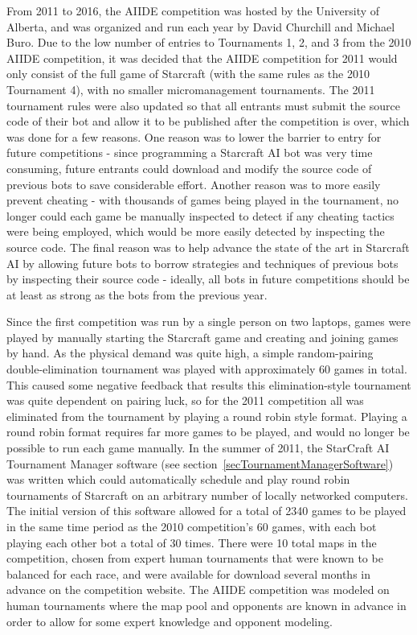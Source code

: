 From 2011 to 2016, the AIIDE competition was hosted by the University of Alberta, and was organized and run each year by David Churchill and Michael Buro. Due to the low number of entries to Tournaments 1, 2, and 3 from the 2010 AIIDE competition, it was decided that the AIIDE competition for 2011 would only consist of the full game of Starcraft (with the same rules as the 2010 Tournament 4), with no smaller micromanagement tournaments. The 2011 tournament rules were also updated so that all entrants must submit the source code of their bot and allow it to be published after the competition is over, which was done for a few reasons. One reason was to lower the barrier to entry for future competitions - since programming a Starcraft AI bot was very time consuming, future entrants could download and modify the source code of previous bots to save considerable effort. Another reason was to more easily prevent cheating - with thousands of games being played in the tournament, no longer could each game be manually inspected to detect if any cheating tactics were being employed, which would be more easily detected by inspecting the source code. The final reason was to help advance the state of the art in Starcraft AI by allowing future bots to borrow strategies and techniques of previous bots by inspecting their source code - ideally, all bots in future competitions should be at least as strong as the bots from the previous year. 

Since the first competition was run by a single person on two laptops, games were played by manually starting the Starcraft game and creating and joining games by hand. As the physical demand was quite high, a simple random-pairing double-elimination tournament was played with approximately 60 games in total. This caused some negative feedback that results this elimination-style tournament was quite dependent on pairing luck, so for the 2011 competition all was eliminated from the tournament by playing a round robin style format. Playing a round robin format requires far more games to be played, and would no longer be possible to run each game manually. In the summer of 2011, the StarCraft AI Tournament Manager software (see section~\ref{secTournamentManagerSoftware}) was written which could automatically schedule and play round robin tournaments of Starcraft on an arbitrary number of locally networked computers. The initial version of this software allowed for a total of 2340 games to be played in the same time period as the 2010 competition's 60 games, with each bot playing each other bot a total of 30 times. There were 10 total maps in the competition, chosen from expert human tournaments that were known to be balanced for each race, and were available for download several months in advance on the competition website. The AIIDE competition was modeled on human tournaments where the map pool and opponents are known in advance in order to allow for some expert knowledge and opponent modeling. 


